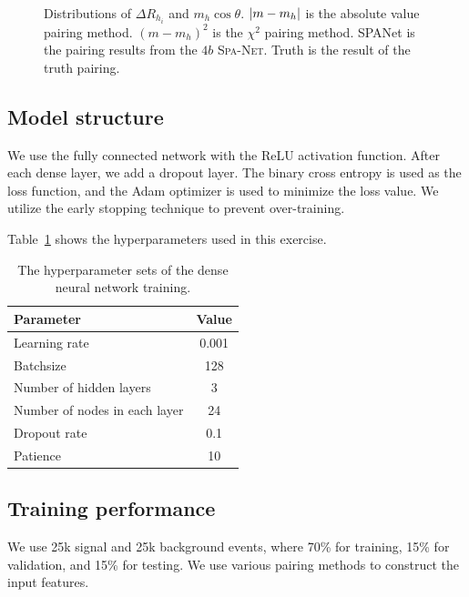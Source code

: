 \documentclass[12pt]{article}
\begin{document}
\begin{figure}[htpb]
{            } \\
            \caption{Distributions of $\Delta R_{h_i}$ and $m_{h} \cos\theta$. $\abs{m-m_h}$ is the absolute value pairing method. $(m-m_h)^2$ is the $\chi^2$ pairing method. SPANet is the pairing results from the $4b$ \textsc{Spa-Net}. Truth is the result of the truth pairing.}
            \label{fig:DNN_input_feature_various_pairing_method}
        \end{figure}
    \subsection{Model structure}%
    \label{sub:model_structure}
        We use the fully connected network with the ReLU activation function. After each dense layer, we add a dropout layer. The binary cross entropy is used as the loss function, and the Adam optimizer is used to minimize the loss value. We utilize the early stopping technique to prevent over-training.

        Table~\ref{tab:DNN_hyperparameters} shows the hyperparameters used in this exercise.
        \begin{table}[htpb]
            \centering
            \caption{The hyperparameter sets of the dense neural network training.}
            \label{tab:DNN_hyperparameters}
            \begin{tabular}{l|c}
            Parameter                     & Value \\ \hline
            Learning rate                 & 0.001 \\
            Batchsize                     & 128   \\
            Number of hidden layers       & 3     \\
            Number of nodes in each layer & 24    \\
            Dropout rate                  & 0.1   \\
            Patience                      & 10
            \end{tabular}
        \end{table}
    \subsection{Training performance}%
    \label{sub:training_performance}
        We use 25k signal and 25k background events, where 70\% for training, 15\% for validation, and 15\% for testing. We use various pairing methods to construct the input features.
\end{document}
